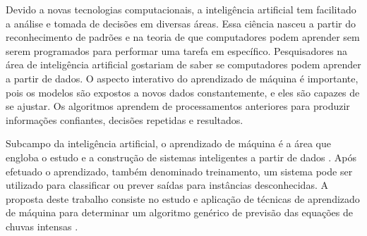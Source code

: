 Devido a novas tecnologias computacionais, a inteligência artificial tem facilitado a análise e tomada de decisões em diversas áreas. Essa ciência nasceu a partir do reconhecimento de padrões e na teoria de que computadores podem aprender sem serem programados para performar uma tarefa em específico. Pesquisadores na área de inteligência artificial gostariam de saber se computadores podem aprender a partir de dados.  O aspecto interativo do aprendizado de máquina é importante, pois os modelos são expostos a novos dados constantemente, e eles são capazes de se ajustar. Os algoritmos aprendem de processamentos anteriores para produzir informações confiantes, decisões repetidas e resultados.

Subcampo da inteligência artificial, o aprendizado de máquina é a área que engloba o estudo e a construção de sistemas inteligentes a partir de dados \cite{ML}. Após efetuado o aprendizado, também denominado treinamento, um sistema pode ser utilizado para classificar ou prever saídas para instâncias desconhecidas. A proposta deste trabalho consiste no estudo e aplicação de técnicas de aprendizado de máquina para determinar um algoritmo genérico de previsão das equações de chuvas intensas \cite{big-data}.

